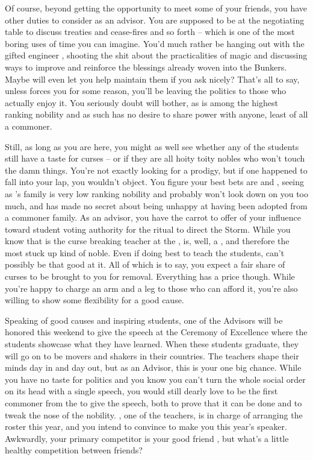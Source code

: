 \documentclass[char]{GL2020}
\begin{document}
Of course, beyond getting the opportunity to meet some of your friends, you have other duties to consider as an advisor. You are supposed to be at the negotiating table to discuss treaties and cease-fires and so forth -- which is one of the most boring uses of time you can imagine. You'd much rather be hanging out with the gifted engineer \cBunker{\full}, shooting the shit about the practicalities of magic and discussing ways to improve and reinforce the blessings already woven into the Bunkers. Maybe \cBunker{\they} will even let you help maintain them if you ask nicely? That's all to say, unless \cEvil{\full} forces you for some reason, you'll be leaving the politics to those who actually enjoy it. You seriously doubt \cEvil{\they} will bother, as \cEvil{} is among the highest ranking nobility and as such has no desire to share power with anyone, least of all a commoner.

Still, as long as you are here, you might as well see whether any of the students still have a taste for curses -- or if they are all hoity toity nobles who won't touch the damn things. You're not exactly looking for a prodigy, but if one happened to fall into your lap, you wouldn't object. You figure your best bets are \cLibAssist{\full} and \cAdopted{\full}, seeing as \cLibAssist{}'s family is very low ranking nobility and probably won't look down on you too much, and \cAdopted{} has made no secret about being unhappy at having been adopted from a commoner family. As an advisor, you have the carrot to offer of your influence toward student voting authority for the ritual to direct the Storm. While you know that \cPrince{\full} is the curse breaking teacher at the \pSc{}, \cPrince{} is, well, a \cPrince{\Heir}, and therefore the most stuck up kind of noble. Even if \cPrince{\they} \cPrince{\were} doing \cPrince{\their} best to teach the students, \cPrince{} can't possibly be that good at it. All of which is to say, you expect a fair share of curses to be brought to you for removal. Everything has a price though. While you're happy to charge an arm and a leg to those who can afford it, you're also willing to show some flexibility for a good cause.

Speaking of good causes and inspiring students, one of the Advisors will be honored this weekend to give the speech at the Ceremony of Excellence where the students showcase what they have learned. When these students graduate, they will go on to be movers and shakers in their countries. The teachers shape their minds day in and day out, but as an Advisor, this is your one big chance. While you have no taste for politics and you know you can't turn the whole social order on its head with a single speech, you would still dearly love to be the first commoner from the \pFarm{} to give the speech, both to prove that it can be done and to tweak the nose of the nobility. \cMusic{\full}, one of the teachers, is in charge of arranging the roster this year, and you intend to convince \cMusic{\them} to make you this year's speaker. Awkwardly, your primary competitor is your good friend \cHedonist{}, but what's a little healthy competition between friends?
\end{document}
